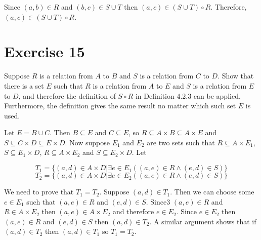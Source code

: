 \documentclass[11pt]{article}
\begin{document}
Since $(a,b) \in R$ and $(b,c) \in S \cup T$ then $(a,c) \in (S \cup T) \circ R$.
Therefore, $(a,c) \in (S \cup T) \circ R$.

\section*{Exercise 15}

Suppose $R$ is a relation from $A$ to $B$ and $S$ is a relation from $C$ to $D$.
Show that there is a set $E$ such that $R$ is a relation from $A$ to $E$ and $S$ 
is a relation from $E$ to $D$, and therefore the definition of $S \circ R$ in 
Definition 4.2.3 can be applied. Furthermore, the definition gives the same 
result no matter which such set $E$ is used.

Let $E = B \cup C$. Then $B \subseteq E$ and $C \subseteq E$, so 
$R \subseteq A \times B \subseteq A \times E$ and 
$S \subseteq C \times D \subseteq E \times D$. Now suppose $E_1$ and $E_2$ are 
two sets such that $R \subseteq A \times E_1$, $S \subseteq E_1 \times D$,
$R \subseteq A \times E_2$ and $S \subseteq E_2 \times D$. Let 

$$T_1 = \{(a,d) \in A \times D | \exists e \in E_1 ((a,e) \in R \wedge (e,d) \in S)\}$$
$$T_2 = \{(a,d) \in A \times D | \exists e \in E_2 ((a,e) \in R \wedge (e,d) \in S)\}$$

We need to prove that $T_1 = T_2$. Suppose $(a,d) \in T_1$. Then we can choose 
some $e \in E_1$ such that $(a,e) \in R$ and $(e,d) \in S$. Since3 $(a,e) \in R$
and $R \in A \times E_2$ then $(a,e) \in A \times E_2$ and therefore $e \in E_2$.
Since $e \in E_2$ then $(a,e) \in R$ and $(e,d) \in S$ then $(a,d) \in T_2$.
A similar argument shows that if $(a,d) \in T_2$ then $(a,d) \in T_1$ so $T_1 = T_2$.
\end{document}
